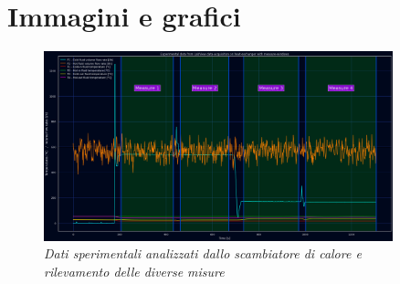 \documentclass[a4paper,10pt]{article}                                                                                       %
\begin{document}
\section{Immagini e grafici}                                                                                                %
\label{sec:imgs_graphs}                                                                                                     %
\begin{figure}[ht!]                                                                                                         %
  \centering                                                                                                                %
  \includegraphics[width=0.9\textwidth]{../final_doc/code_exports/imgs/measures.png}                                        %
  \caption{\textit{Dati sperimentali analizzati dallo scambiatore di calore e rilevamento delle diverse misure}}            %
  \label{fig:measures}                                                                                                      %
\end{figure}                                                                                                                %
\end{document}
